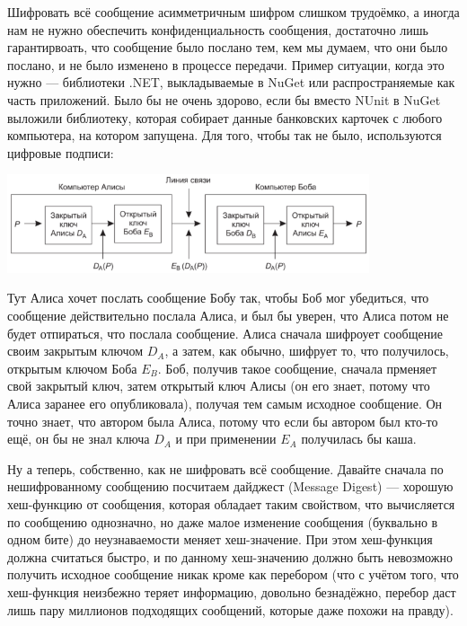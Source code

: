 \documentclass{../../text-style}
\begin{document}
Шифровать всё сообщение асимметричным шифром слишком трудоёмко, а иногда нам не нужно обеспечить конфиденциальность сообщения, достаточно лишь гарантирвоать, что сообщение было послано тем, кем мы думаем, что они было послано, и не было изменено в процессе передачи. Пример ситуации, когда это нужно --- библиотеки .NET, выкладываемые в NuGet или распространяемые как часть приложений. Было бы не очень здорово, если бы вместо NUnit в NuGet выложили библиотеку, которая собирает данные банковских карточек с любого компьютера, на котором запущена. Для того, чтобы так не было, используются цифровые подписи:

\begin{center}
    \includegraphics[width=0.8\textwidth]{signature.png}
\end{center}

Тут Алиса хочет послать сообщение Бобу так, чтобы Боб мог убедиться, что сообщение действительно послала Алиса, и был бы уверен, что Алиса потом не будет отпираться, что послала сообщение. Алиса сначала шифроует сообщение своим закрытым ключом $D_A$, а затем, как обычно, шифрует то, что получилось, открытым ключом Боба $E_B$. Боб, получив такое сообщение, сначала прменяет свой закрытый ключ, затем открытый ключ Алисы (он его знает, потому что Алиса заранее его опубликовала), получая тем самым исходное сообщение. Он точно знает, что автором была Алиса, потому что если бы автором был кто-то ещё, он бы не знал ключа $D_A$ и при применении $E_A$ получилась бы каша. 

Ну а теперь, собственно, как не шифровать всё сообщение. Давайте сначала по нешифрованному сообщению посчитаем дайджест (Message Digest) --- хорошую хеш-функцию от сообщения, которая обладает таким свойством, что вычисляется по сообщению однозначно, но даже малое изменение сообщения (буквально в одном бите) до неузнаваемости меняет хеш-значение. При этом хеш-функция должна считаться быстро, и по данному хеш-значению должно быть невозможно получить исходное сообщение никак кроме как перебором (что с учётом того, что хеш-функция неизбежно теряет информацию, довольно безнадёжно, перебор даст лишь пару миллионов подходящих сообщений, которые даже похожи на правду). 
\end{document}
